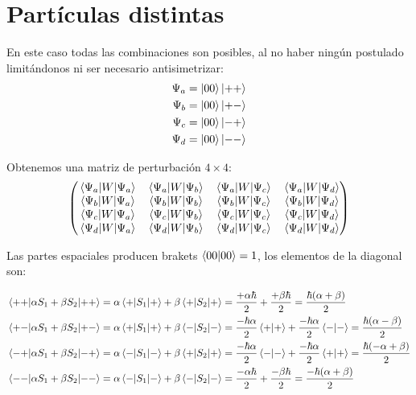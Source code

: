 \section*{Partículas distintas}
En este caso todas las combinaciones son posibles, al no haber ningún
postulado limitándonos ni ser necesario antisimetrizar:
\begin{align}
  \Psi_a &= \ket{00}\ket{++} \\
  \Psi_b &= \ket{00}\ket{+-} \\
  \Psi_c &= \ket{00}\ket{-+} \\
  \Psi_d &= \ket{00}\ket{--} 
\end{align}

Obtenemos una matriz de perturbación $4\times4$:
\begin{equation}
  \begin{pmatrix}
    \mel{\Psi_a}{W}{\Psi_a} & \mel{\Psi_a}{W}{\Psi_b} & \mel{\Psi_a}{W}{\Psi_c} & \mel{\Psi_a}{W}{\Psi_d} \\
    \mel{\Psi_b}{W}{\Psi_a} & \mel{\Psi_b}{W}{\Psi_b} & \mel{\Psi_b}{W}{\Psi_c} & \mel{\Psi_b}{W}{\Psi_d} \\
    \mel{\Psi_c}{W}{\Psi_a} & \mel{\Psi_c}{W}{\Psi_b} & \mel{\Psi_c}{W}{\Psi_c} & \mel{\Psi_c}{W}{\Psi_d} \\
    \mel{\Psi_d}{W}{\Psi_a} & \mel{\Psi_d}{W}{\Psi_b} & \mel{\Psi_d}{W}{\Psi_c} & \mel{\Psi_d}{W}{\Psi_d} \\
  \end{pmatrix} 
\end{equation}

Las partes espaciales producen brakets $\braket{00}{00}=1$, los
elementos de la diagonal son:
\begin{fullwidth}
  \begin{align}
    \mel{++}{\alpha S_1 + \beta S_2}{++} 
    &= \alpha\mel{+}{S_1}{+} + \beta \mel{+}{S_2}{+} = \frac{+\alpha
      \hbar}{2} + \frac{+\beta \hbar}{2} = \frac{\hbar
      (\alpha+\beta)}{2} \\
    \mel{+-}{\alpha S_1 + \beta S_2}{+-} 
    &= \alpha\mel{+}{S_1}{+} + \beta \mel{-}{S_2}{-} =
      \frac{-\hbar\alpha}{2}\braket{+}{+} +
      \frac{-\hbar\alpha}{2}\braket{-}{-} = \frac{\hbar(\alpha-\beta)}{2}\\
    \mel{-+}{\alpha S_1 + \beta S_2}{-+} 
    &= \alpha\mel{-}{S_1}{-} + \beta \mel{+}{S_2}{+} =
      \frac{-\hbar\alpha}{2}\braket{-}{-} +
      \frac{-\hbar\alpha}{2}\braket{+}{+} = \frac{\hbar(-\alpha + \beta)}{2}\\
    \mel{--}{\alpha S_1 + \beta S_2}{--} 
    &= \alpha\mel{-}{S_1}{-} + \beta \mel{-}{S_2}{-} = \frac{-\alpha
      \hbar}{2} + \frac{-\beta \hbar}{2} = \frac{-\hbar
      (\alpha+\beta)}{2} 
  \end{align}
\end{fullwidth}

